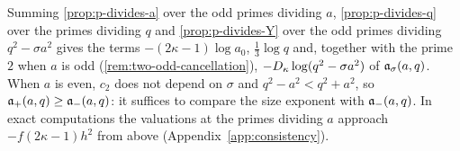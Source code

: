 \begin{remark}\label{rem:worse-sign}
Summing \cref{prop:p-divides-a} over the odd primes dividing $a$, \cref{prop:p-divides-q} over
the primes dividing $q$ and \cref{prop:p-divides-Y} over the odd primes dividing
$q^2-\sigma a^2$ gives the terms $-(2\kappa-1)\log a_0$, $\frac13\log q$ and, together with the
prime $2$ when $a$ is odd (\cref{rem:two-odd-cancellation}), $-D_\kappa\log(q^2-\sigma a^2)$ of
$\mathfrak{a}_\sigma(a,q)$. When $a$ is even, $c_2$ does not depend on $\sigma$ and
$q^2-a^2<q^2+a^2$, so $\mathfrak{a}_+(a,q)\ge\mathfrak{a}_-(a,q)$: it suffices to compare the size exponent
with $\mathfrak{a}_-(a,q)$. In exact computations the valuations at the primes dividing $a$ approach
$-f(2\kappa-1)h^2$ from above (Appendix~\ref{app:consistency}).
\end{remark}
